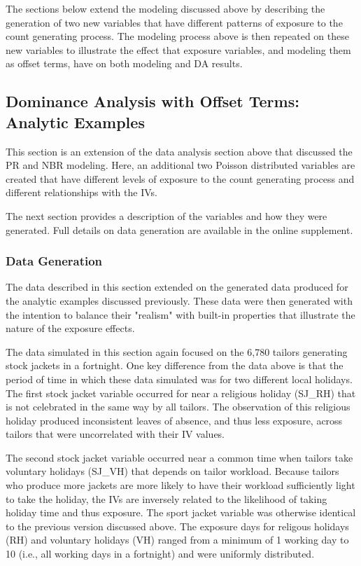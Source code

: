 \documentclass[ShortAfour,times,sageapa]{sagej}
\begin{document}
	The sections below extend the modeling discussed above by describing the generation of two new variables that have different patterns of exposure to the count generating process. 
	The modeling process above is then repeated on these new variables to illustrate the effect that exposure variables, and modeling them as offset terms, have on both modeling and DA results.
	
	\subsection{Dominance Analysis with Offset Terms: Analytic Examples}
	
	This section is an extension of the data analysis section above that discussed the PR and NBR modeling.
	Here, an additional two Poisson distributed variables are created that have different levels of exposure to the count generating process and different relationships with the IVs.
	
	The next section provides a description of the variables and how they were generated. Full details on data generation are available in the online supplement.
	
		\subsubsection{Data Generation}
		
	The data described in this section extended on the generated data produced for the analytic examples discussed previously.
	These data were then generated with the intention to balance their "realism" with built-in properties that illustrate the nature of the exposure effects.
	
	The data simulated in this section again focused on the 6,780 tailors generating stock jackets in a fortnight.
	One key difference from the data above is that the period of time in which these data simulated was for two different local holidays.
	The first stock jacket variable occurred for near a religious holiday (SJ\_RH) that is not celebrated in the same way by all tailors.
	The observation of this religious holiday produced inconsistent leaves of absence, and thus less exposure, across tailors that were uncorrelated with their IV values.
	
	The second stock jacket variable occurred near a common time when tailors take voluntary holidays (SJ\_VH) that depends on tailor workload.
	Because tailors who produce more jackets are more likely to have their workload sufficiently light to take the holiday, the IVs are inversely related to the likelihood of taking holiday time and thus exposure.
	The sport jacket variable was otherwise identical to the previous version discussed above. 
	The exposure days for religous holidays (RH) and voluntary holidays (VH) ranged from a minimum of 1 working day to 10 (i.e., all working days in a fortnight) and were uniformly distributed.
	
\end{document}

